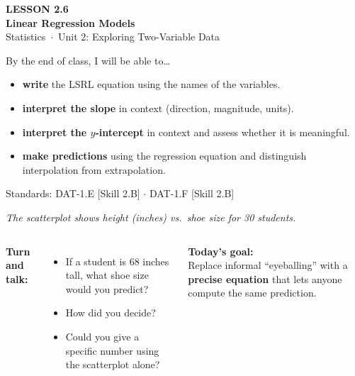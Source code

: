 \documentclass[aspectratio=169, 11pt]{beamer}
\begin{document}
{
\begin{frame}[plain]
  \vspace{2.8cm}\hspace{0.55cm}%
  \begin{minipage}{0.9\textwidth}
    {\color{goldacc}\bfseries\small LESSON 2.6}\\[0.5cm]
    {\color{white}\bfseries\LARGE Linear Regression Models}\\[1.2cm]
    {\color{skymid}\small Statistics~$\cdot$~Unit 2: Exploring Two-Variable Data}
  \end{minipage}
\end{frame}
}

\begin{frame}[t, plain]
  \vspace{0.3cm}
  By the end of class, I will be able to\dots
  \begin{itemize}
    \item \textbf{write} the LSRL equation using the names of the variables.
    \item \textbf{interpret the slope} in context (direction, magnitude, units).
    \item \textbf{interpret the $y$-intercept} in context and assess whether it is meaningful.
    \item \textbf{make predictions} using the regression equation and distinguish
          interpolation from extrapolation.
  \end{itemize}
  \vspace{0.4cm}
  \textcolor{goldacc}{\small Standards: DAT-1.E [Skill 2.B] $\cdot$ DAT-1.F [Skill 2.B]}
\end{frame}

\begin{frame}[t, plain]
  \vspace{0.3cm}
  \textit{The scatterplot shows height (inches) vs.\ shoe size for 30 students.}
  \vspace{0.3cm}
  \begin{columns}
      \textbf{Turn and talk:}
      \begin{itemize}
        \item If a student is 68 inches tall, what shoe size would you predict?
        \item How did you decide?
        \item Could you give a specific number using the scatterplot alone?
      \end{itemize}
      \textbf{Today's goal:}\\[6pt]
      Replace informal ``eyeballing'' with a \textbf{precise equation} that lets anyone
      compute the same prediction.
  \end{columns}
\end{frame}
\end{document}
